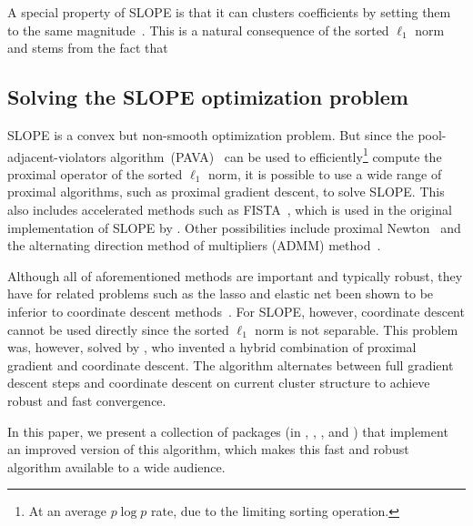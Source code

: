 \documentclass[article]{jss}
\begin{document}


A special property of SLOPE is that it can clusters coefficients by
setting them to the same magnitude~\citep{figueiredo2016,bogdan2022}. This is a natural
consequence of the sorted \(\ell_1\) norm and stems from the fact that

\subsection{Solving the SLOPE optimization problem}

SLOPE is a convex but non-smooth optimization problem. But since the
pool-adjacent-violators algorithm~(PAVA)~\citep{barlow1972} can be used to
efficiently\footnote{At an average \(p \log p\) rate, due to the limiting
  sorting operation.} compute the proximal operator of the sorted \(\ell_1\)
norm, it is possible to use a wide range of proximal algorithms, such
as proximal gradient descent, to solve SLOPE. This also includes accelerated
methods such as FISTA~\citep{beck2009}, which is used in the original
implementation of SLOPE by \citet{bogdan2015}. Other possibilities include
proximal Newton~\citep{lee2014} and the alternating direction method of
multipliers (ADMM) method~\citep{boyd2010}.

Although all of aforementioned methods are important and typically robust, they
have for related problems such as the lasso and elastic net been shown to be
inferior to coordinate descent methods~\citep{friedman2007,friedman2010}. For
SLOPE, however, coordinate descent cannot be used directly since the sorted
\(\ell_1\) norm is not separable. This problem was, however, solved by
\citet{larsson2023}, who invented a hybrid combination of proximal gradient and
coordinate descent. The algorithm alternates between full gradient descent
steps and coordinate descent on current cluster structure to achieve robust and
fast convergence.

In this paper, we present a collection of packages (in ,
, , and ) that implement an
improved version of this algorithm, which makes this fast and robust algorithm
available to a wide audience.
\end{document}
